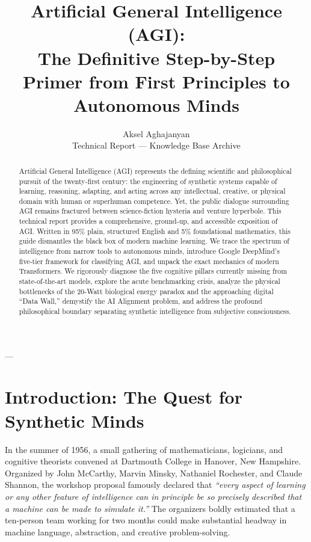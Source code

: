 \documentclass[11pt,journal,onecolumn]{IEEEtran}
\begin{document}
\title{Artificial General Intelligence (AGI): \\ The Definitive Step-by-Step Primer from First Principles to Autonomous Minds}

\author{Aksel Aghajanyan \\ \small Technical Report --- Knowledge Base Archive}

\maketitle

\begin{abstract}
Artificial General Intelligence (AGI) represents the defining scientific and philosophical pursuit of the twenty-first century: the engineering of synthetic systems capable of learning, reasoning, adapting, and acting across any intellectual, creative, or physical domain with human or superhuman competence. Yet, the public dialogue surrounding AGI remains fractured between science-fiction hysteria and venture hyperbole. This technical report provides a comprehensive, ground-up, and accessible exposition of AGI. Written in 95\% plain, structured English and 5\% foundational mathematics, this guide dismantles the black box of modern machine learning. We trace the spectrum of intelligence from narrow tools to autonomous minds, introduce Google DeepMind's five-tier framework for classifying AGI, and unpack the exact mechanics of modern Transformers. We rigorously diagnose the five cognitive pillars currently missing from state-of-the-art models, explore the acute benchmarking crisis, analyze the physical bottlenecks of the 20-Watt biological energy paradox and the approaching digital ``Data Wall,'' demystify the AI Alignment problem, and address the profound philosophical boundary separating synthetic intelligence from subjective consciousness.
\end{abstract}

---

\section{Introduction: The Quest for Synthetic Minds}
\label{sec:intro}

In the summer of 1956, a small gathering of mathematicians, logicians, and cognitive theorists convened at Dartmouth College in Hanover, New Hampshire. Organized by John McCarthy, Marvin Minsky, Nathaniel Rochester, and Claude Shannon, the workshop proposal famously declared that \textit{``every aspect of learning or any other feature of intelligence can in principle be so precisely described that a machine can be made to simulate it.''} The organizers boldly estimated that a ten-person team working for two months could make substantial headway in machine language, abstraction, and creative problem-solving.
\end{document}
